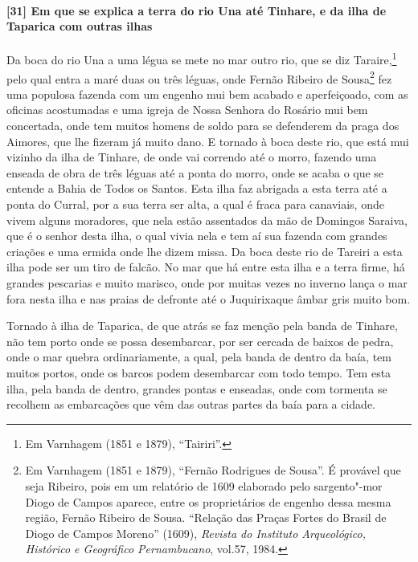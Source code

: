 \begin{linenumbers}
\paragraph{[31] Em que se explica a terra do rio Una até Tinhare, e da ilha de Taparica com
outras ilhas}\quad
Da boca do rio Una a uma légua se mete no mar outro rio, que se diz Taraire,\footnote{ Em
Varnhagem (1851 e 1879), ``Tairiri''.} pelo qual entra a maré duas ou três léguas, onde
Fernão Ribeiro de Sousa\footnote{ Em Varnhagem (1851 e 1879), ``Fernão Rodrigues de
Sousa''. É provável que seja Ribeiro, pois em um relatório de 1609 elaborado pelo
sargento"-mor Diogo de Campos aparece, entre os proprietários de engenho dessa mesma
região, Fernão Ribeiro de Sousa. “Relação das Praças Fortes do Brasil de Diogo de Campos
Moreno” (1609), \textit{Revista do Instituto Arqueológico, Histórico e Geográfico
Pernambucano}, vol.57, 1984.} fez uma populosa fazenda com um engenho mui bem acabado e
aperfeiçoado, com as oficinas acostumadas e uma igreja de Nossa Senhora do Rosário mui bem
concertada, onde tem muitos homens de soldo para se defenderem da praga dos Aimores, que
lhe fizeram já muito dano. E tornado à boca deste rio, que
está mui vizinho da ilha de Tinhare, de onde vai correndo até o morro, fazendo uma enseada
de obra de três léguas até a ponta do morro, onde se acaba o que se entende a Bahia de
Todos os Santos. Esta ilha faz abrigada a esta terra até a ponta do Curral, por a sua
terra ser alta, a qual é fraca para canaviais, onde vivem alguns moradores, que nela estão
assentados da mão de Domingos Saraiva, que é o senhor desta ilha, o qual vivia nela e tem
aí sua fazenda com grandes criações e uma ermida onde lhe dizem missa. Da boca deste rio
de Tareiri a esta ilha pode ser um tiro de falcão. No mar que há entre esta ilha e a terra
firme, há grandes pescarias e muito marisco, onde por muitas vezes no inverno lança o mar
fora nesta ilha e nas praias de defronte até o Juquirixaque âmbar gris muito bom.

Tornado à ilha de Taparica, de que atrás se faz menção pela banda de Tinhare, não tem
porto onde se possa desembarcar, por ser cercada de baixos de pedra, onde o mar quebra
ordinariamente, a qual, pela banda de dentro da baía, tem muitos portos, onde os barcos
podem desembarcar com todo tempo. Tem esta ilha, pela banda de dentro, grandes pontas e
enseadas, onde com tormenta se recolhem as embarcações que vêm das outras partes da baía
para a cidade.


\end{linenumbers}
